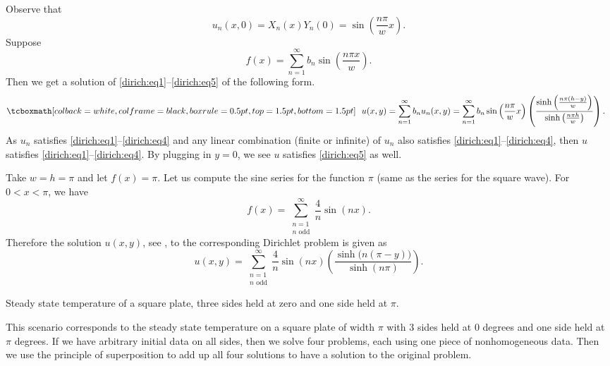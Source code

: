 Observe that
\begin{equation*}
u_n(x,0) = X_n(x)Y_n(0) = \sin \left( \frac{n \pi}{w} x \right) .
\end{equation*}
Suppose
\begin{equation*}
f(x) =
\sum_{n=1}^\infty
b_n \sin \left( \frac{n \pi x }{w} \right) .
\end{equation*}
Then we get a solution of \eqref{dirich:eq1}--\eqref{dirich:eq5} of the
following form.
\begin{equation*}
\mybxbg{
~~
u(x,y) =
\sum_{n=1}^\infty
b_n u_n(x,y)
=
\sum_{n=1}^\infty
b_n 
\sin \left( \frac{n \pi}{w} x \right)
\left( \frac{\sinh \left( \frac{n \pi (h-y) }{w} \right)}%
{\sinh \left( \frac{n \pi h }{w} \right)} \right)
.
~~
}
\end{equation*}
As $u_n$ satisfies \eqref{dirich:eq1}--\eqref{dirich:eq4} and any linear
combination (finite or infinite) of $u_n$ also satisfies 
\eqref{dirich:eq1}--\eqref{dirich:eq4}, then $u$ satisfies
\eqref{dirich:eq1}--\eqref{dirich:eq4}.
By plugging in $y=0$, we see $u$
satisfies 
\eqref{dirich:eq5} as well.

\begin{example}
Take $w=h=\pi$ and let $f(x) = \pi$.  Let us compute the sine
series for the function $\pi$ (same as the series for the square wave).
For $0 < x < \pi$, we have
\begin{equation*}
f(x) =
\sum_{\substack{n=1 \\ n \text{ odd}}}^\infty
\frac{4}{n}
\sin (n x) .
\end{equation*}
Therefore the solution $u(x,y)$, see ,
to the corresponding Dirichlet problem is
given as
\begin{equation*}
u(x,y) =
\sum_{\substack{n=1 \\ n \text{ odd}}}^\infty
\frac{4}{n}
\sin (n x)
\left( \frac{\sinh \bigl( n (\pi-y) \bigr) }{\sinh (n \pi)} \right)
.
\end{equation*}

\begin{myfig}
\capstart
{}
\caption{Steady state temperature of a square plate, three sides
held at zero and one side held at $\pi$.\label{dirichsquareplot:fig}}
\end{myfig}
\end{example}

This scenario
corresponds to the steady state temperature on a square plate of width $\pi$
with 3 sides held at 0 degrees and one side held at $\pi$ degrees.
If we have arbitrary initial data on all sides, then we solve four problems,
each using one piece of nonhomogeneous data.  Then we use the principle of
superposition to add up all four solutions to have a solution to the
original problem.

